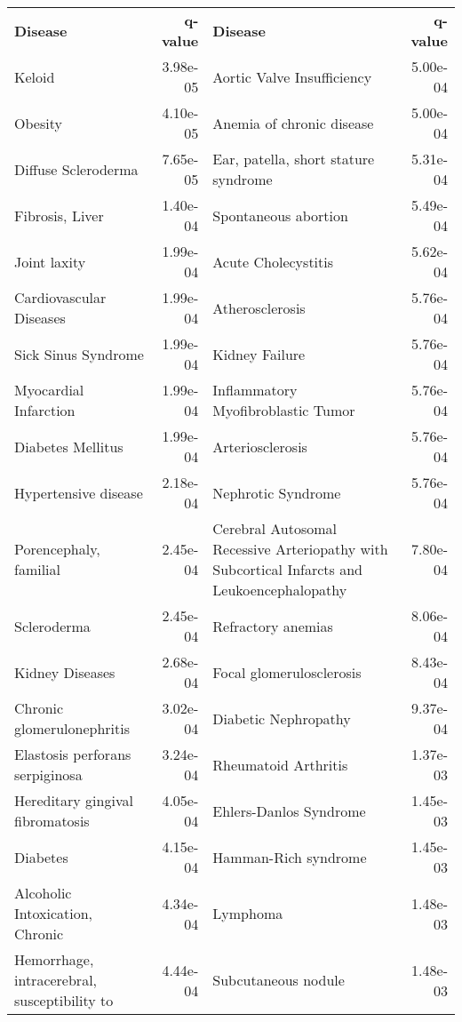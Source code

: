 \documentclass[fleqn,10pt]{SelfArx} %
\begin{document}
\begin{table}[ht]
	\centering
	\scriptsize
	\begin{tabularx}{\textwidth}{lRlR}
		\textbf{\color{white} Disease} & \textbf{\color{white} q-value} & \textbf{\color{white} Disease} & \textbf{\color{white} q-value} \\
		Keloid & 3.98e-05 & Aortic Valve Insufficiency & 5.00e-04 \\ 
		Obesity & 4.10e-05 & Anemia of chronic disease & 5.00e-04 \\ 
		Diffuse Scleroderma & 7.65e-05 & Ear, patella, short stature syndrome & 5.31e-04 \\ 
		Fibrosis, Liver & 1.40e-04 & Spontaneous abortion & 5.49e-04 \\ 
		Joint laxity & 1.99e-04 & Acute Cholecystitis & 5.62e-04 \\ 
		Cardiovascular Diseases & 1.99e-04 & Atherosclerosis & 5.76e-04 \\ 
		Sick Sinus Syndrome & 1.99e-04 & Kidney Failure & 5.76e-04 \\ 
		Myocardial Infarction & 1.99e-04 & Inflammatory Myofibroblastic Tumor & 5.76e-04 \\ 
		Diabetes Mellitus & 1.99e-04 & Arteriosclerosis & 5.76e-04 \\ 
		Hypertensive disease & 2.18e-04 & Nephrotic Syndrome & 5.76e-04 \\ 
		Porencephaly, familial & 2.45e-04 & Cerebral Autosomal Recessive Arteriopathy with Subcortical Infarcts and Leukoencephalopathy & 7.80e-04 \\ 
		Scleroderma & 2.45e-04 & Refractory anemias & 8.06e-04 \\ 
		Kidney Diseases & 2.68e-04 & Focal glomerulosclerosis & 8.43e-04 \\ 
		Chronic glomerulonephritis & 3.02e-04 & Diabetic Nephropathy & 9.37e-04 \\ 
		Elastosis perforans serpiginosa & 3.24e-04 & Rheumatoid Arthritis & 1.37e-03 \\ 
		Hereditary gingival fibromatosis & 4.05e-04 & Ehlers-Danlos Syndrome & 1.45e-03 \\ 
		Diabetes & 4.15e-04 & Hamman-Rich syndrome & 1.45e-03 \\ 
		Alcoholic Intoxication, Chronic & 4.34e-04 & Lymphoma & 1.48e-03 \\ 
		Hemorrhage, intracerebral, susceptibility to & 4.44e-04 & Subcutaneous nodule & 1.48e-03 \\ 

\end{tabularx}
\end{table}
\end{document}
